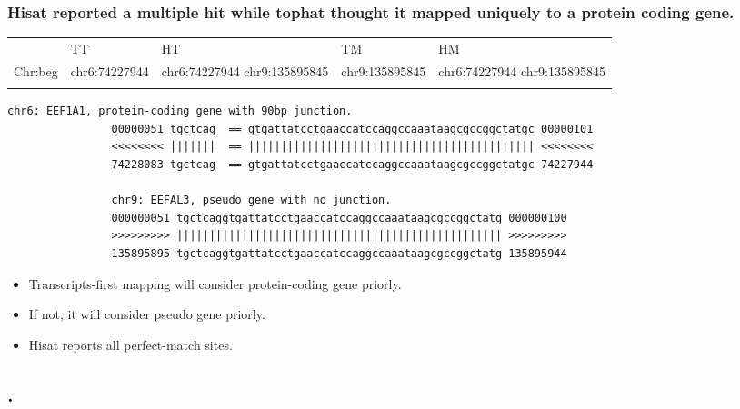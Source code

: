 \begin{frame}[c,fragile]
\frametitle{ Hisat reported a multiple hit while tophat thought it mapped uniquely to a protein coding gene. }
	\begin{examples}
		\tiny{
			\begin{table}
			\centering
			\begin{tabular}{  C{1cm}  C{1.2cm}  C{1.2cm}  C{1.2cm}  C{1.2cm}  }
			\hline\noalign{\smallskip}
						& TT 	& HT  &	TM	 & HM  	\\
			\noalign{\smallskip}\hline\noalign{\smallskip}
			Chr:beg	&	chr6:74227944		& chr6:74227944 chr9:135895845    &	chr9:135895845 & chr6:74227944 chr9:135895845	\\
			\noalign{\smallskip}\hline
			\end{tabular}
			\end{table}
		}
		\begin{lstlisting}[basicstyle=\tiny]
				chr6: EEF1A1, protein-coding gene with 90bp junction.
				00000051 tgctcag  == gtgattatcctgaaccatccaggccaaataagcgccggctatgc 00000101
				<<<<<<<< |||||||  == |||||||||||||||||||||||||||||||||||||||||||| <<<<<<<<
				74228083 tgctcag  == gtgattatcctgaaccatccaggccaaataagcgccggctatgc 74227944
				
				chr9: EEFAL3, pseudo gene with no junction.
				000000051 tgctcaggtgattatcctgaaccatccaggccaaataagcgccggctatg 000000100
				>>>>>>>>> |||||||||||||||||||||||||||||||||||||||||||||||||| >>>>>>>>>
				135895895 tgctcaggtgattatcctgaaccatccaggccaaataagcgccggctatg 135895944

		\end{lstlisting}
		\scriptsize{
			\begin{itemize}
				\item Transcripts-first mapping will consider protein-coding gene priorly. \\ \pause
				\item If not, it will consider pseudo gene priorly. \\ \pause
				\item Hisat reports all perfect-match sites.
			\end{itemize}
		}
		\end{examples}
	
\end{frame}

\subsection{.}
